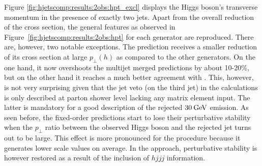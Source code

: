 Figure \ref{fig:hjetscomp:results:2obs:hpt_excl} displays the 
Higgs boson's transverse momentum in the presence of exactly two jets. 
Apart from the overall reduction of the cross section, the general 
features as observed in Figure~\ref{fig:hjetscomp:results:2obs:hpt}
for each generator are reproduced. There are, however, two notable
exceptions. The \Powheg \NNLOPS prediction receives a smaller
reduction of its cross section at large $p_\perp(h)$ as compared to
the other generators. On the one hand, it now overshoots the multijet
merged predictions by about 10-20\%, but on the other hand it reaches
a much better agreement with \Sherpa \NNLOPS. This, however, is not
very surprising given that the jet veto (on the third jet) in the
\NNLOPS calculations is only described at parton shower level lacking
any matrix element input. The latter is mandatory for a good
description of the rejected $30\text{\:GeV}$ emission. As seen before, the
fixed-order predictions start to lose their perturbative stability when
the $p_\perp$ ratio between the observed Higgs boson and the rejected
jet turns out to be large. This effect is more pronounced for the
\Minlo procedure because it generates lower scale values on
average. In the \Loopsim approach, perturbative stability is however
restored as a result of the inclusion of $hjjj$ information.

